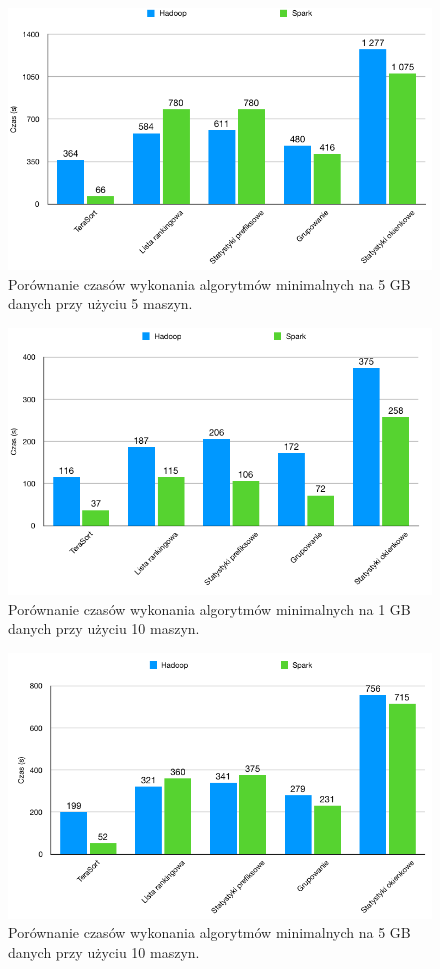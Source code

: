 \documentclass[licencjacka]{pracamgr}
\begin{document}
\begin{figure}[H]
\centering
  \caption{Porównanie czasów wykonania algorytmów minimalnych na 5 GB danych przy użyciu 5 maszyn.}
  \includegraphics[width=13cm]{5_5_execution.png}
\end{figure}

\begin{figure}[H]
\centering
  \caption{Porównanie czasów wykonania algorytmów minimalnych na 1 GB danych przy użyciu 10 maszyn.}
  \includegraphics[width=13cm]{1_10_execution.png}
\end{figure}

\begin{figure}[H]
\centering
  \caption{Porównanie czasów wykonania algorytmów minimalnych na 5 GB danych przy użyciu 10 maszyn.}
  \includegraphics[width=13cm]{5_10_execution.png}
\end{figure}
\end{document}
